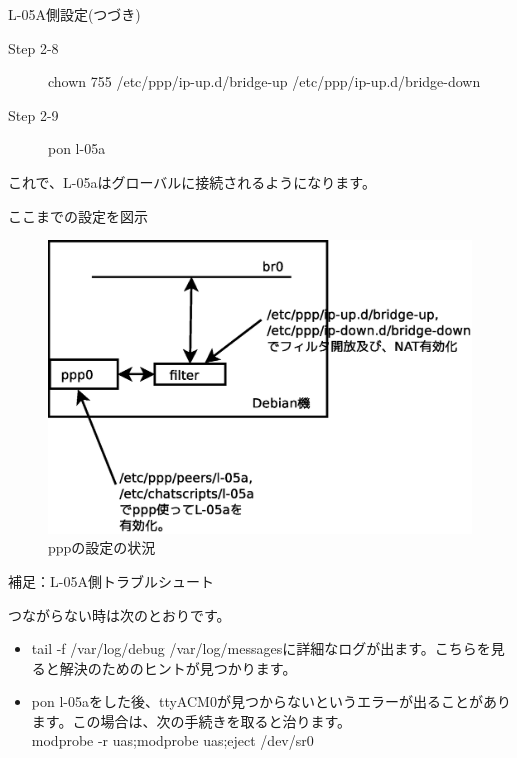 \begin{frame}{L-05A側設定(つづき)}

  \begin{description}
    \item [Step 2-8] chown 755 /etc/ppp/ip-up.d/bridge-up /etc/ppp/ip-up.d/bridge-down
    \item [Step 2-9] pon l-05a
  \end{description}      
 これで、L-05aはグローバルに接続されるようになります。
\end{frame}

\begin{frame}{ここまでの設定を図示}

\begin{figure}[htbp]
\includegraphics[width=0.8\hsize]{image201512/pppd.eps}
\caption{pppの設定の状況}
\end{figure}
  
\end{frame}

\begin{frame}{補足：L-05A側トラブルシュート}

 つながらない時は次のとおりです。

 \begin{itemize}
 \item tail -f /var/log/debug /var/log/messagesに詳細なログが出ます。こちらを見ると解決のためのヒントが見つかります。
 \item pon l-05aをした後、ttyACM0が見つからないというエラーが出ることがあります。この場合は、次の手続きを取ると治ります。\\
 modprobe -r uas;modprobe uas;eject /dev/sr0
 \end{itemize} 

\end{frame}

